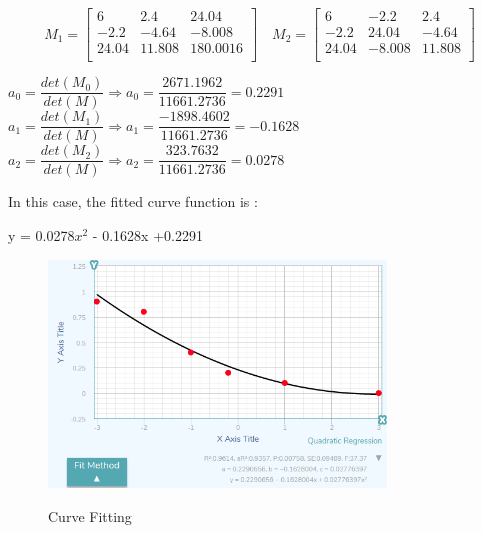 \[
 M_{1} = \begin{bmatrix}
6 & 2.4 & 24.04 \\
-2.2 & -4.64 & -8.008 \\
24.04 & 11.808 & 180.0016 \\

\end{bmatrix} \quad
 M_{2} = \begin{bmatrix}
6 & -2.2 & 2.4 \\
-2.2 & 24.04 & -4.64 \\
24.04 & -8.008 & 11.808 \\

\end{bmatrix}
\]

\begin{center}

$ a_{0} = \dfrac{det(M_{0})}{det(M)}   \Longrightarrow  a_{0} = \dfrac{ 2671.1962}{11661.2736} = 0.2291$  \vfill 
$ a_{1} = \dfrac{det(M_{1})}{det(M)} \Longrightarrow  a_{1} = \dfrac{ -1898.4602}{11661.2736} = -0.1628$  \vfill 
$ a_{2} = \dfrac{det(M_{2})}{det(M)} \Longrightarrow  a_{2} = \dfrac{ 323.7632}{11661.2736} = 0.0278$


\end{center}

In this case, the fitted curve function is : \vfill 
\begin{center}
y = 0.0278$x^{2} $ - 0.1628x +0.2291
\end{center}

\begin{figure}[H]
 \centering
  \includegraphics[width=0.8\textwidth]{./Bilder/Curve_Fitting.png}\label{Curve_Fitting}
  \caption{Curve Fitting\cite{Curve_Fitting_Plot}}
\end{figure}




%





